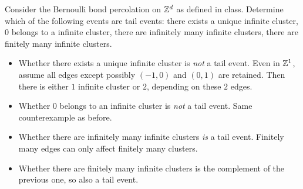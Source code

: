 \documentclass[12pt]{article}
\begin{document}
\begin{problem*}
    Consider the Bernoulli bond percolation on $\mathbb{Z}^d$ as defined in class.
    Determine which of the following events are tail events:
        there exists a unique infinite cluster,
        $0$ belongs to a infinite cluster,
        there are infinitely many infinite clusters,
        there are finitely many infinite clusters.
\end{problem*}
\begin{solution} \leavevmode
    \begin{itemize}
        \item Whether there exists a unique infinite cluster is \emph{not}
        a tail event.
        Even in $\mathbb{Z}^1$, assume all edges except possibly $(-1, 0)$ and
        $(0, 1)$ are retained.
        Then there is either $1$ infinite cluster or $2$, depending on
        these $2$ edges.
        \item Whether $0$ belongs to an infinite cluster is \emph{not} a
        tail event.
        Same counterexample as before.
        \item Whether there are infinitely many infinite clusters \emph{is}
        a tail event.
        Finitely many edges can only affect finitely many clusters.
        \item Whether there are finitely many infinite clusters is the
        complement of the previous one, so also a tail event. \qedhere
    \end{itemize}
\end{solution}
\end{document}
